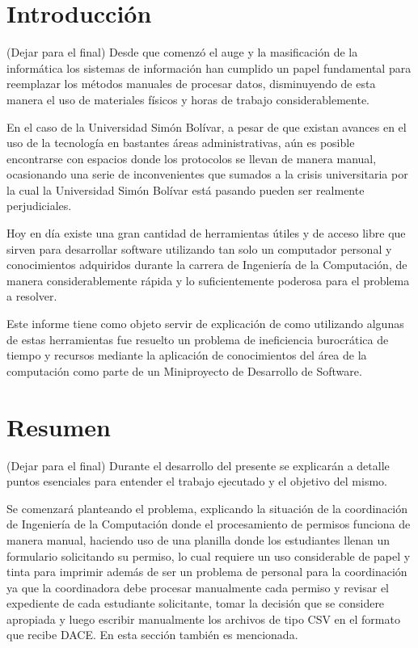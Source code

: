 \documentclass[]{article}
\begin{document}
{
\hypersetup{linkcolor=black}
\setcounter{tocdepth}{3}
\tableofcontents
}
\newpage

\section{Introducción}\label{introducciuxf3n}

(Dejar para el final) Desde que comenzó el auge y la masificación de la
informática los sistemas de información han cumplido un papel
fundamental para reemplazar los métodos manuales de procesar datos,
disminuyendo de esta manera el uso de materiales físicos y horas de
trabajo considerablemente.

En el caso de la Universidad Simón Bolívar, a pesar de que existan
avances en el uso de la tecnología en bastantes áreas administrativas,
aún es posible encontrarse con espacios donde los protocolos se llevan
de manera manual, ocasionando una serie de inconvenientes que sumados a
la crisis universitaria por la cual la Universidad Simón Bolívar está
pasando pueden ser realmente perjudiciales.

Hoy en día existe una gran cantidad de herramientas útiles y de acceso
libre que sirven para desarrollar software utilizando tan solo un
computador personal y conocimientos adquiridos durante la carrera de
Ingeniería de la Computación, de manera considerablemente rápida y lo
suficientemente poderosa para el problema a resolver.

Este informe tiene como objeto servir de explicación de como utilizando
algunas de estas herramientas fue resuelto un problema de ineficiencia
burocrática de tiempo y recursos mediante la aplicación de conocimientos
del área de la computación como parte de un Miniproyecto de Desarrollo
de Software.

\section{Resumen}\label{resumen}

(Dejar para el final) Durante el desarrollo del presente se explicarán a
detalle puntos esenciales para entender el trabajo ejecutado y el
objetivo del mismo.

Se comenzará planteando el problema, explicando la situación de la
coordinación de Ingeniería de la Computación donde el procesamiento de
permisos funciona de manera manual, haciendo uso de una planilla donde
los estudiantes llenan un formulario solicitando su permiso, lo cual
requiere un uso considerable de papel y tinta para imprimir además de
ser un problema de personal para la coordinación ya que la coordinadora
debe procesar manualmente cada permiso y revisar el expediente de cada
estudiante solicitante, tomar la decisión que se considere apropiada y
luego escribir manualmente los archivos de tipo CSV en el formato que
recibe DACE. En esta sección también es mencionada.
\end{document}
